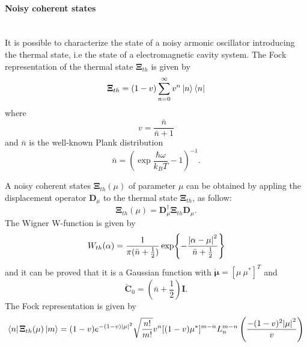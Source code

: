     \paragraph{Noisy coherent states}\mbox{} \\
        \label{par:cohState}
        It is possible to characterize the state of a noisy armonic oscillator introducing
        the thermal state, i.e the state of a electromagnetic cavity system.
        The Fock representation of the thermal state $\pmb{\Xi}_{th}$ is given by \cite{tesiGuerrini}
        \begin{equation}
            \pmb{\Xi}_{th}=(1-v)\sum_{n=0}^{\infty}v^n\ket{n}\bra{n}
        \end{equation}
        where
        \begin{equation*}
            v=\frac{\bar{n}}{\bar{n}+1}
        \end{equation*}
        and $\bar{n}$ is the well-known Plank distribution
        \begin{equation*}
            \bar{n}=\left(\exp{\frac{\hbar\omega}{k_B T}}-1\right)^{-1}.
        \end{equation*}

        A noisy coherent states $\pmb{\Xi}_{th}(\mu)$ of parameter $\mu$ can be obtained by 
        appling the displacement operator $\pmb{D}_\mu$ to the thermal state $\pmb{\Xi}_{th}$,
        as follow:
        \begin{equation}
            \pmb{\Xi}_{th}(\mu)=\pmb{D}_\mu^\dagger \pmb{\Xi}_{th} \pmb{D}_\mu.
        \end{equation}
        The Wigner W-function is given by \cite{QuantumNoise}
        \begin{equation}
            W_{th}(\alpha)=\frac{1}{\pi(\bar{n}+\frac{1}{2})}\exp{-\frac{\absolutevalue{\alpha-\mu}^2}
            {\bar{n}+\frac{1}{2}}}
        \end{equation}
        and it can be proved that it is a Gaussian function with $\check{\pmb{\mu}}=[\mu\ \mu^*]^T$
        and
        \begin{equation*}
            \check{\pmb{C}}_0=\left(\bar{n}+\frac{1}{2}\right)\pmb{I}.
        \end{equation*}
        The Fock representation is given by
        \begin{equation}
            \bra{n}\pmb{\Xi}_{th}(\mu)\ket{m}=(1-v)e^{-(1-v)\absolutevalue{\mu}^2}\sqrt{\frac{n!}{m!}}
            v^n[(1-v)\mu^*]^{m-n}L_n^{m-n}\left(\frac{-(1-v)^2\absolutevalue{\mu}^2}{v}\right)
            \label{eq:FRCS}
        \end{equation}


